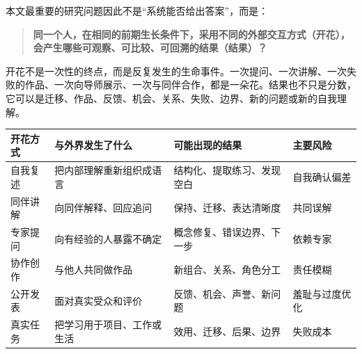 \documentclass[UTF8,a4paper,11pt]{ctexart}
\begin{document}
本文最重要的研究问题因此不是“系统能否给出答案”，而是：

\begin{quote}
\textbf{同一个人，在相同的前期生长条件下，采用不同的外部交互方式（开花），会产生哪些可观察、可比较、可回溯的结果（结果）？}
\end{quote}

开花不是一次性的终点，而是反复发生的生命事件。一次提问、一次讲解、一次失败的作品、一次向导师展示、一次与同伴合作，都是一朵花。结果也不只是分数，它可以是迁移、作品、反馈、机会、关系、失败、边界、新的问题或新的自我理解。


\begin{center}
\begin{longtable}{@{}p{2.5cm}p{3.7cm}p{4.4cm}p{3.2cm}@{}}
\toprule
\textbf{开花方式} & \textbf{与外界发生了什么} & \textbf{可能出现的结果} & \textbf{主要风险} \\
\midrule
自我复述 & 把内部理解重新组织成语言 & 结构化、提取练习、发现空白 & 自我确认偏差 \\
同伴讲解 & 向同伴解释、回应追问 & 保持、迁移、表达清晰度 & 共同误解 \\
专家提问 & 向有经验的人暴露不确定 & 概念修复、错误边界、下一步 & 依赖专家 \\
协作创作 & 与他人共同做作品 & 新组合、关系、角色分工 & 责任模糊 \\
公开发表 & 面对真实受众和评价 & 反馈、机会、声誉、新问题 & 羞耻与过度优化 \\
真实任务 & 把学习用于项目、工作或生活 & 效用、迁移、后果、边界 & 失败成本 \\
\bottomrule
\end{longtable}
\end{center}
\end{document}
